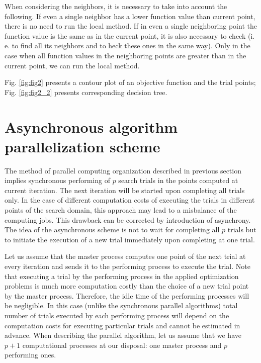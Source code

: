 \documentclass{svproc}
\begin{document}
When considering the neighbors, it is necessary to take into account the following. If even a single  neighbor has a lower function value than current point, there is no need to run the local method. If in  even a single neighboring point the function value is the same as in the current point, it is also necessary  to check (i. e. to find all its neighbors and to heck these ones in the same way). Only in the case when  all function values in the neighboring points are greater than in the current point, we can run the local  method.

Fig. \ref{fig:fig2} presents a contour plot of an objective function and the trial points; Fig.  \ref{fig:fig2_2} presents corresponding decision tree. 



\section{Asynchronous algorithm parallelization scheme}\label{SecASP}

The method of parallel computing organization described in  previous section implies synchronous  performing of $p$ search trials in the points computed at current iteration. The next iteration will be  started upon completing all trials only. In the case of different computation costs of executing the trials in different points of the search  domain, this approach may lead to a misbalance of the computing jobs.  This drawback can be corrected by introduction of asynchrony. The idea of the asynchronous scheme is not to wait for completing all $p$ trials but to initiate the  execution of a new trial immediately upon completing at one trial. 

Let us assume that the master process computes one point of the next trial at every iteration and sends  it to the performing process to execute the trial. Note that executing a trial by the performing process in  the applied optimization problems is much more computation costly than the choice of a new trial point  by the master process. Therefore, the idle time of the performing processes will be negligible. In this  case (unlike the synchronous parallel algorithms) total number of trials executed by each performing  process will depend on the computation costs for executing particular trials and cannot be estimated in  advance. When describing the parallel algorithm, let us assume that we have $p+1$ computational  processes at our disposal: one master process and $p$ performing ones.
\end{document}
